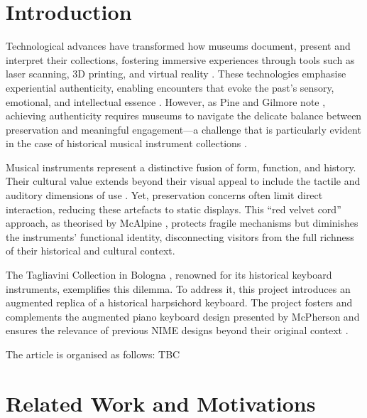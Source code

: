 \section{Introduction}\label{introduction}

Technological advances have transformed how museums document, present and interpret their collections, fostering immersive experiences through tools such as laser scanning, 3D printing, and virtual reality \cite{allard2005use,Wachowiak01082009,RCM_2024_3D,Kuzminsky_LaserScan_2012,Schaich_3D_2007}. These technologies emphasise experiential authenticity, enabling encounters that evoke the past's sensory, emotional, and intellectual essence \cite{trant_Auth_1999}. However, as Pine and Gilmore note \cite{pinegilmore_2007}, achieving authenticity requires museums to navigate the delicate balance between preservation and meaningful engagement—a challenge that is particularly evident in the case of historical musical instrument collections \cite{McAlpine2014}.

Musical instruments represent a distinctive fusion of form, function, and history. Their cultural value extends beyond their visual appeal to include the tactile and auditory dimensions of use \cite{Fritz2017}. Yet, preservation concerns often limit direct interaction, reducing these artefacts to static displays. This ``red velvet cord'' approach, as theorised by McAlpine \cite{McAlpine2014}, protects fragile mechanisms but diminishes the instruments’ functional identity, disconnecting visitors from the full richness of their historical and cultural context.

The Tagliavini Collection in Bologna \cite{Tagliavini2007}, renowned for its historical keyboard instruments, exemplifies this dilemma. To address it, this project introduces an augmented replica of a historical harpsichord keyboard. 
The project fosters and complements the augmented piano keyboard design presented by McPherson \cite{McPherson2013} and ensures the relevance of previous NIME designs beyond their original context \cite{Masu_NIME_2023}. 


The article is organised as follows: TBC



\section{Related Work and Motivations}\label{related-work}


